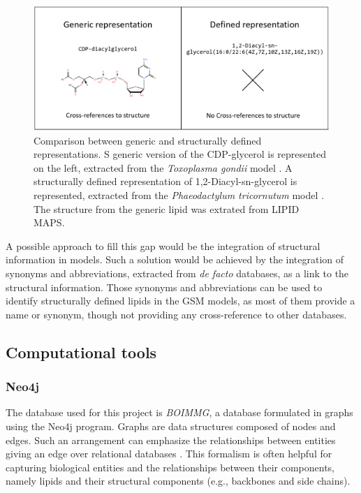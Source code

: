 \documentclass{llncs}
\begin{document}
\begin{figure}
    \includegraphics[width=\textwidth]{imagens/comparação.png}
    \caption{Comparison between generic and structurally defined representations. S generic version of the CDP-glycerol is represented on the left, extracted from the \textit{Toxoplasma gondii} model \cite{Tymoshenko2015}. A structurally defined representation of 1,2-Diacyl-sn-glycerol is represented, extracted from the \textit{Phaeodactylum tricornutum} model \cite{Levering2016}. The structure from the generic lipid was extrated from LIPID MAPS.}
\end{figure}

A possible approach to fill this gap would be the integration of structural information in models. 
Such a solution would be achieved by the integration of synonyms and abbreviations, extracted from \textit{de facto} databases, as a link to the structural information. Those synonyms and abbreviations can be used to identify structurally defined lipids in the GSM models, as most of them provide a name or synonym, though not providing any cross-reference to other databases. 

\subsection{Computational tools}
\subsubsection{Neo4j}
The database used for this project is \textit{BOIMMG}, a database formulated in graphs using the Neo4j program. Graphs are data structures composed of nodes and edges. 
Such an arrangement can emphasize the relationships between entities giving an edge over relational databases \cite{Miller2013}. 
This formalism is often helpful for capturing biological entities and the relationships between their components, namely lipids and their structural components (e.g., backbones and side chains). 
\end{document}
